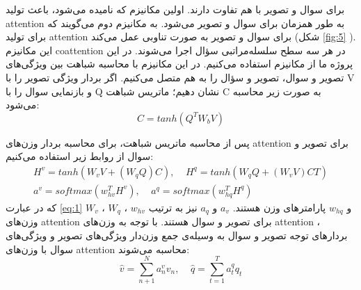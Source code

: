 {{{			
			 برای سوال و تصویر با هم تفاوت دارند. اولین مکانیزم که
			 نامیده می‌شود، باعث تولید attention به طور همزمان برای سوال و تصویر می‌شود. به مکانیزم دوم
			 می‌گویند که برای تولید attention‌ برای سوال و تصویر به صورت تناوبی عمل می‌کند (شکل 
			\ref{fig:5}
			 ). این مکانیزم coattention در هر سه سطح سلسله‌مراتبی سؤال اجرا می‌شوند.  در این پروژه ما از مکانیزم 
			 استفاده می‌کنیم. در این مکانیزم با محاسبه شباهت بین ویژگی‌های تصویر و سوال، تصویر و سؤال را به هم متصل می‌کنیم. اگر بردار ویژگی تصویر را با V و بازنمایی سوال را با Q نشان دهیم؛ ماتریس شباهت C 
			 به صورت زیر محاسبه می‌شود:
			 \begin{equation}
			 	C = tanh(Q^TW_bV)
			 \end{equation}
			 
			 پس از محاسبه ماتریس شباهت، برای محاسبه بردار وزن‌های attention برای تصویر و سوال از روابط زیر استفاده می‌کنیم:
			 \begin{equation}
			 \begin{aligned}
			 	H^v = tanh(W_vV + (W_qQ)C), \ \ \ \ \  H^q = tanh(W_qQ+ (W_vV)CT)\\
			 	a^v = softmax(w^T_{hv}H^v), \ \ \ \ \  a^q = softmax(w^T_{hq}H^q) \ \ \ \ \ \ \ \ \ \ \ \ \ 
			 \end{aligned}
			 \label{eq:1}
			 \end{equation}
			 که در عبارت 
			 \ref{eq:1}
			 $W_v$
			 ، 
			 $W_q$
			 ،
			 $w_{hv}$
			 و
			 $w_{hq}$
			 پارامترهای وزن هستند. 
			 $a_v$
			 و 
			 $a_q$
			 نیز به ترتیب وزن‌های attention برای تصویر و سوال هستند. با توجه به وزن‌های attention ، بردارهای توجه تصویر و سوال به وسیله‌ی جمع وزن‌دار ویژگی‌های تصویر و ویژگی‌های سوال با وزن‌های attention محاسبه می‌شوند:
			 \begin{equation}
			 \hat{v} =\sum_{n+1}^{N} a^v_nv_n,\ \ \ \ \ \hat{q} = \sum_{t=1}^{T}a^q_t q_t
			 \end{equation}
			 
		}
	
}}
